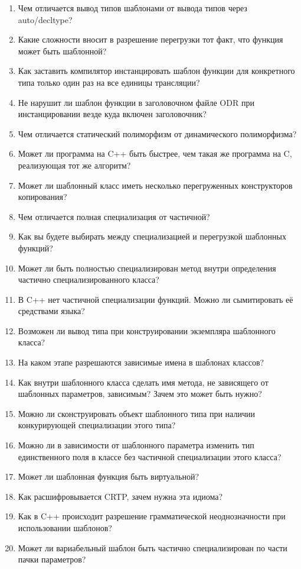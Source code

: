 \documentclass[a4paper,12pt,oneside]{book}
\begin{document}
\begin{enumerate}
\item Чем отличается вывод типов шаблонами от вывода типов через auto/decltype?
\item Какие сложности вносит в разрешение перегрузки тот факт, что функция может быть шаблонной?
\item Как заставить компилятор инстанцировать шаблон функции для конкретного типа только один раз на все единицы трансляции?
\item Не нарушит ли шаблон функции в заголовочном файле ODR при инстанцировании везде куда включен заголовочник?
\item Чем отличается статический полиморфизм от динамического полиморфизма?
\item Может ли программа на C++ быть быстрее, чем такая же программа на C, реализующая тот же алгоритм?
\item Может ли шаблонный класс иметь несколько перегруженных конструкторов копирования?
\item Чем отличается полная специализация от частичной?
\item Как вы будете выбирать между специализацией и перегрузкой шаблонных функций?
\item Может ли быть полностью специализирован метод внутри определения частично специализированного класса?
\item В C++ нет частичной специализации функций. Можно ли сымитировать её средствами языка?
\item Возможен ли вывод типа при конструировании экземпляра шаблонного класса?
\item На каком этапе разрешаются зависимые имена в шаблонах классов?
\item Как внутри шаблонного класса сделать имя метода, не зависящего от шаблонных параметров, зависимым? Зачем это может быть нужно?
\item Можно ли сконструировать объект шаблонного типа при наличии конкурирующей специализации этого типа?
\item Можно ли в зависимости от шаблонного параметра изменить тип единственного поля в классе без частичной специализации этого класса?
\item Может ли шаблонная функция быть виртуальной?
\item Как расшифровывается CRTP, зачем нужна эта идиома?
\item Как в C++ происходит разрешение грамматической неоднозначности при использовании шаблонов?
\item Может ли вариабельный шаблон быть частично специализирован по части пачки параметров?

\end{enumerate}
\end{document}
